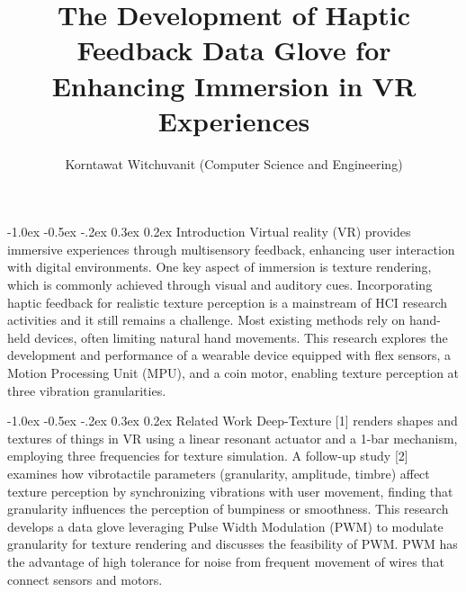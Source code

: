 \documentclass[a4paper,twocolumn]{article}
\title{\textbf{\Large The Development of Haptic Feedback Data Glove for Enhancing Immersion in VR Experiences}}
\author{\small{Korntawat Witchuvanit (Computer Science and Engineering)}}
\date{\vspace{-3em}}
\begin{document}
\small
\maketitle

\makeatletter
\renewcommand\section{\@startsection{section}{1}{\z@}%
  {-1.0ex \@plus -0.5ex \@minus -.2ex}%
  {0.3ex \@plus 0.2ex}%
  {\normalfont\normalsize\bfseries}}
\makeatother



\section{Introduction}
Virtual reality (VR) provides immersive experiences through multisensory feedback, enhancing user interaction with digital environments. One key aspect of immersion is texture rendering, which is commonly achieved through visual and auditory cues. Incorporating haptic feedback for realistic texture perception is a mainstream of HCI research activities and it still remains a challenge. Most existing methods rely on hand-held devices, often limiting natural hand movements. This research explores the development and performance of a wearable device equipped with flex sensors, a Motion Processing Unit (MPU), and a coin motor, enabling texture perception at three vibration granularities.

\section{Related Work}
Deep-Texture [1] renders shapes and textures of things in VR using a linear resonant actuator and a 1-bar mechanism, employing three frequencies for texture simulation. A follow-up study [2] examines how vibrotactile parameters (granularity, amplitude, timbre) affect texture perception by synchronizing vibrations with user movement, finding that granularity influences the perception of bumpiness or smoothness. This research develops a data glove leveraging Pulse Width Modulation (PWM) to modulate granularity for texture rendering and discusses the feasibility of PWM. PWM has the advantage of high tolerance for noise from frequent movement of wires that connect sensors and motors.
\end{document}
